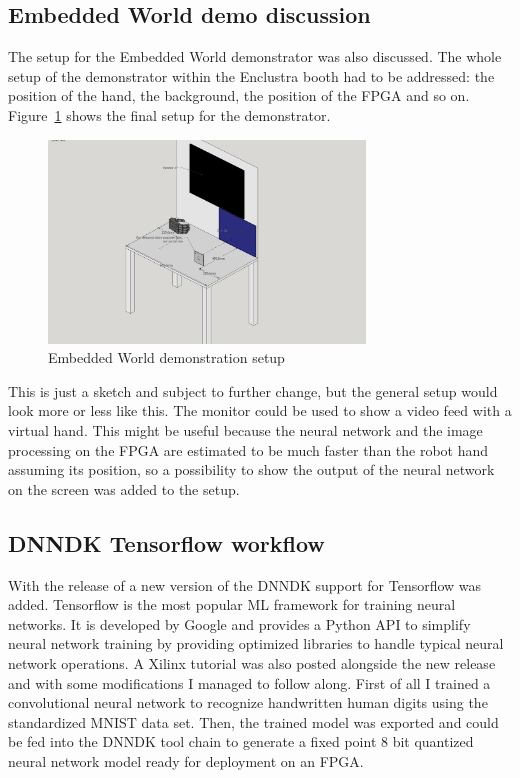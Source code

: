 \subsection{Embedded World demo discussion}
The setup for the Embedded World demonstrator was also discussed. The whole setup of the demonstrator within the Enclustra booth had to be addressed: the position of the hand, the background, the position of the \ac{FPGA} and so on. Figure~\ref{fig:ew_booth} shows the final setup for the demonstrator.
\begin{figure}[!htb]
	\centering
		\includegraphics[width=0.75\textwidth]{bilder/RPS_sketchup.png}
		\caption{Embedded World demonstration setup}
		\label{fig:ew_booth}
\end{figure}
This is just a sketch and subject to further change, but the general setup would look more or less like this. The monitor could be used to show a video feed with a virtual hand. This might be useful because the neural network and the image processing on the \ac{FPGA} are estimated to be much faster than the robot hand assuming its position, so a possibility to show the output of the neural network on the screen was added to the setup.
\subsection{\acs{DNNDK} Tensorflow workflow}
With the release of a new version of the \ac{DNNDK} support for Tensorflow was added. Tensorflow is the most popular \ac{ML} framework for training neural networks. It is developed by Google and provides a Python \ac{API} to simplify neural network training by providing optimized libraries to handle typical neural network operations. A Xilinx tutorial was also posted alongside the new release and with some modifications I managed to follow along. First of all I trained a convolutional neural network to recognize handwritten human digits using the standardized \ac{MNIST} data set. Then, the trained model was exported and could be fed into the \ac{DNNDK} tool chain to generate a fixed point 8 bit quantized neural network model ready for deployment on an \ac{FPGA}.

